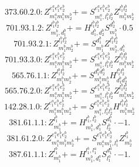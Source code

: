 \documentclass[letterpaper,10pt,fleqn,leqno,onecolumn]{article}
\begin{document}
\begin{equation} \;\;\;\;\;\;  373.60.2.0: Z^{e_{1}^{a}e_{1}^{b}e_{2}^{b}}_{m_{1}^{a}m_{1}^{b}m_{2}^{b}}+=S^{e_{1}^{a}e_{1}^{b}e_{2}^{b}}_{m_{1}^{a},l_{1}^{b}l_{2}^{b}}Z^{l_{1}^{b}l_{2}^{b}}_{m_{1}^{b}m_{2}^{b}} \end{equation}
\begin{equation} \;\;\;\;\;\;  701.93.1.2: Z^{l_{1}^{b}l_{2}^{b}}_{m_{1}^{b},d_{1}^{b}}+=H^{l_{1}^{b}l_{2}^{b}}_{d_{1}^{b},d_{2}^{b}}S^{d_{2}^{b}}_{m_{1}^{b}}\cdot 0.5 \end{equation}
\begin{equation} \;\;\;\;\;\;  701.93.2.1: Z^{l_{1}^{b}l_{2}^{b}}_{m_{1}^{b}m_{2}^{b}}+=S^{d_{1}^{b}}_{m_{1}^{b}}Z^{l_{1}^{b}l_{2}^{b}}_{m_{2}^{b},d_{1}^{b}} \end{equation}
\begin{equation} \;\;\;\;\;\;  701.93.3.0: Z^{e_{1}^{a}e_{1}^{b}e_{2}^{b}}_{m_{1}^{a}m_{1}^{b}m_{2}^{b}}+=S^{e_{1}^{a}e_{1}^{b}e_{2}^{b}}_{m_{1}^{a},l_{1}^{b}l_{2}^{b}}Z^{l_{1}^{b}l_{2}^{b}}_{m_{1}^{b}m_{2}^{b}} \end{equation}
\begin{equation} \;\;\;\;\;\;  565.76.1.1: Z^{l_{1}^{b}l_{2}^{b}}_{m_{1}^{b}m_{2}^{b}}+=S^{d_{1}^{b}d_{2}^{b}}_{m_{1}^{b}m_{2}^{b}}H^{l_{1}^{b}l_{2}^{b}}_{d_{1}^{b}d_{2}^{b}} \end{equation}
\begin{equation} \;\;\;\;\;\;  565.76.2.0: Z^{e_{1}^{a}e_{1}^{b}e_{2}^{b}}_{m_{1}^{a}m_{1}^{b}m_{2}^{b}}+=S^{e_{1}^{a}e_{1}^{b}e_{2}^{b}}_{m_{1}^{a},l_{1}^{b}l_{2}^{b}}Z^{l_{1}^{b}l_{2}^{b}}_{m_{1}^{b}m_{2}^{b}} \end{equation}
\begin{equation} \;\;\;\;\;\;  142.28.1.0: Z^{e_{1}^{a}e_{1}^{b}e_{2}^{b}}_{m_{1}^{a}m_{1}^{b}m_{2}^{b}}+=S^{e_{1}^{a}e_{1}^{b}e_{2}^{b}}_{m_{1}^{a},l_{1}^{b}l_{2}^{b}}H^{l_{1}^{b}l_{2}^{b}}_{m_{1}^{b}m_{2}^{b}} \end{equation}
\begin{equation} \;\;\;\;\;\;  381.61.1.1: Z^{l_{1}^{b}}_{m_{1}^{b}}+=H^{l_{1}^{b},l_{2}^{b}}_{m_{1}^{b},d_{1}^{b}}S^{d_{1}^{b}}_{l_{2}^{b}}\cdot -1. \end{equation}
\begin{equation} \;\;\;\;\;\;  381.61.2.0: Z^{e_{1}^{a}e_{1}^{b}e_{2}^{b}}_{m_{1}^{a}m_{1}^{b}m_{2}^{b}}+=S^{e_{1}^{a}e_{1}^{b}e_{2}^{b}}_{m_{1}^{a}m_{1}^{b},l_{1}^{b}}Z^{l_{1}^{b}}_{m_{2}^{b}} \end{equation}
\begin{equation} \;\;\;\;\;\;  387.61.1.1: Z^{l_{1}^{b}}_{m_{1}^{b}}+=H^{l_{1}^{b},l_{1}^{a}}_{m_{1}^{b},d_{1}^{a}}S^{d_{1}^{a}}_{l_{1}^{a}}\cdot -1. \end{equation}
\end{document}

